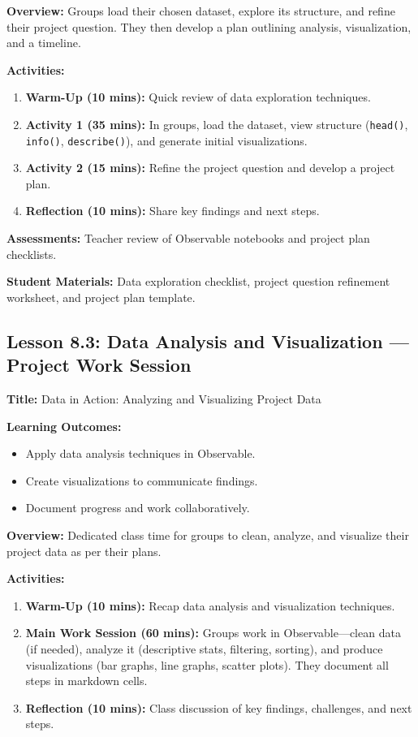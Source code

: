 \documentclass{tufte-book}
\begin{document}
\medskip
\textbf{Overview:}  
Groups load their chosen dataset, explore its structure, and refine their project question. They then develop a plan outlining analysis, visualization, and a timeline.

\medskip
\textbf{Activities:}
\begin{enumerate}[label=\arabic*.]
    \item \textbf{Warm-Up (10 mins):} Quick review of data exploration techniques.
    \item \textbf{Activity 1 (35 mins):} In groups, load the dataset, view structure (\texttt{head()}, \texttt{info()}, \texttt{describe()}), and generate initial visualizations.
    \item \textbf{Activity 2 (15 mins):} Refine the project question and develop a project plan.
    \item \textbf{Reflection (10 mins):} Share key findings and next steps.
\end{enumerate}

\medskip
\textbf{Assessments:}  
Teacher review of Observable notebooks and project plan checklists.

\medskip
\textbf{Student Materials:}  
Data exploration checklist, project question refinement worksheet, and project plan template.

\subsection{Lesson 8.3: Data Analysis and Visualization --- Project Work Session}
\textbf{Title:} Data in Action: Analyzing and Visualizing Project Data

\medskip
\textbf{Learning Outcomes:}
\begin{itemize}[leftmargin=*, label={\textbullet}]
    \item Apply data analysis techniques in Observable.
    \item Create visualizations to communicate findings.
    \item Document progress and work collaboratively.
\end{itemize}

\medskip
\textbf{Overview:}  
Dedicated class time for groups to clean, analyze, and visualize their project data as per their plans.

\medskip
\textbf{Activities:}
\begin{enumerate}[label=\arabic*.]
    \item \textbf{Warm-Up (10 mins):} Recap data analysis and visualization techniques.
    \item \textbf{Main Work Session (60 mins):} Groups work in Observable—clean data (if needed), analyze it (descriptive stats, filtering, sorting), and produce visualizations (bar graphs, line graphs, scatter plots). They document all steps in markdown cells.
    \item \textbf{Reflection (10 mins):} Class discussion of key findings, challenges, and next steps.
\end{enumerate}
\end{document}
